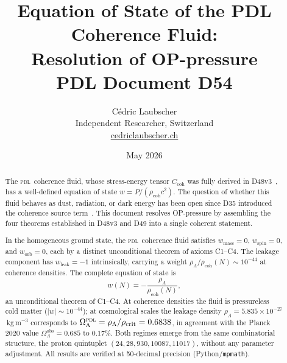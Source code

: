 \documentclass[12pt,a4paper]{article}
\newcommand{\PDL}{\textsc{pdl}}
\newcommand{\Ccoh}{C_{\mathrm{coh}}}
\newcommand{\rhocoh}{\rho_{\mathrm{coh}}}
\newcommand{\rhoLambda}{\rho_\Lambda}
\newcommand{\quintuplet}{(24,28,930,10087,11017)}
\newcommand{\OmegaL}{\Omega_\Lambda}
\begin{document}
\title{\textbf{Equation of State of the PDL Coherence Fluid:\\
Resolution of OP-pressure}\\[6pt]
{\large PDL Document D54}}

\author{C\'edric Laubscher\\[4pt]
\small Independent Researcher, Switzerland\\
\small \href{https://cedriclaubscher.ch}{cedriclaubscher.ch}}

\date{May 2026}

\maketitle

\begin{abstract}
The \PDL\ coherence fluid, whose stress-energy tensor $\Ccoh$ was fully derived in D48v3~\cite{PDL_D48v3_2026}, has a well-defined equation of state $w = P/(\rhocoh c^2)$. The question of whether this fluid behaves as dust, radiation, or dark energy has been open since D35 introduced the coherence source term~\cite{PDL_D35_2026}. This document resolves OP-pressure by assembling the four theorems established in D48v3 and D49 into a single coherent statement.

In the homogeneous ground state, the \PDL\ coherence fluid satisfies $w_{\mathrm{mass}} = 0$, $w_{\mathrm{spin}} = 0$, and $w_{\mathrm{orb}} = 0$, each by a distinct unconditional theorem of axioms C1--C4. The leakage component has $w_{\mathrm{leak}} = -1$ intrinsically, carrying a weight $\rhoLambda/\rhocoh(N) \sim 10^{-44}$ at coherence densities. The complete equation of state is
\begin{equation*}
w(N) = -\frac{\rhoLambda}{\rhocoh(N)},
\end{equation*}
an unconditional theorem of C1--C4. At coherence densities the fluid is pressureless cold matter ($|w| \sim 10^{-44}$); at cosmological scales the leakage density $\rhoLambda = 5.835\times10^{-27}$\,kg\,m$^{-3}$ corresponds to $\OmegaL^{\PDL} = \rhoLambda/\rho_{\mathrm{crit}} = 0.6838$, in agreement with the Planck\,2020 value $\OmegaL^{\mathrm{obs}} = 0.685$ to $0.17\%$. Both regimes emerge from the same combinatorial structure, the proton quintuplet $\quintuplet$, without any parameter adjustment. All results are verified at 50-decimal precision (Python/\texttt{mpmath}).
\end{abstract}
\end{document}
